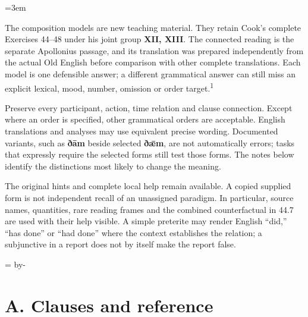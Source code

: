 \BookRecto
\begingroup
\renewcommand{\runningtitle}{Unit 18. Answer key}
\emergencystretch=3em
\newcommand{\itempara}[2]{\par\addvspace{3pt}\noindent\hangindent=1.8em\hangafter=1\makebox[1.8em][l]{#1.}#2\par}
\newcommand{\reserve}[1]{\par\penalty-100\begingroup\dimen0=\pagegoal\advance\dimen0 by-\pagetotal\ifdim\dimen0<#1\newpage\fi\endgroup}

\raggedright
{}

The composition models are new teaching material. They retain Cook’s complete Exercises 44–48 under his joint group \textbf{XII, XIII}. The connected reading is the separate Apollonius passage, and its translation was prepared independently from the actual Old English before comparison with other complete translations. Each model is one defensible answer; a different grammatical answer can still miss an explicit lexical, mood, number, omission or order target.\textsuperscript{1}

Preserve every participant, action, time relation and clause connection. Except where an order is specified, other grammatical orders are acceptable. English translations and analyses may use equivalent precise wording. Documented variants, such as \textbf{ðām} beside selected \textbf{ðǣm}, are not automatically errors; tasks that expressly require the selected forms still test those forms. The notes below identify the distinctions most likely to change the meaning.

The original hints and complete local help remain available. A copied supplied form is not independent recall of an unassigned paradigm. In particular, source names, quantities, rare reading frames and the combined counterfactual in 44.7 are used with their help visible. A simple preterite may render English “did,” “has done” or “had done” where the context establishes the relation; a subjunctive in a report does not by itself make the report false.

\reserve{7\baselineskip}
\section*{A. Clauses and reference}

